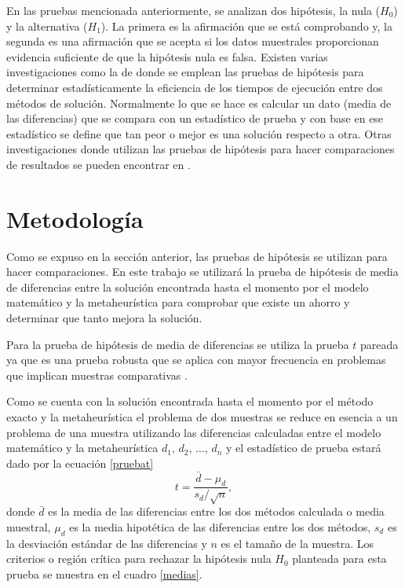 \documentclass[preprint,12pt, pdftex]{elsarticle}
\begin{document}
En las pruebas mencionada anteriormente, se analizan dos hipótesis, la nula ($H_{0}$) y la alternativa ($H_{1}$). La primera es la afirmación que se está comprobando y, la segunda es una afirmación que se acepta si los datos muestrales proporcionan evidencia suficiente de que la hipótesis nula es falsa. Existen varias investigaciones como la de \citet{saucedo2005} donde se emplean las pruebas de hipótesis para determinar estadísticamente la eficiencia de los tiempos de ejecución entre dos métodos de solución. Normalmente lo que se hace es calcular un dato (media de las diferencias) que se compara con un estadístico de prueba y con base en ese estadístico se define que tan peor o mejor es una solución respecto a otra. Otras investigaciones donde utilizan las pruebas de hipótesis para hacer comparaciones de resultados se pueden encontrar en \citet{puentes2016, Gao2016}.

\section{Metodología} \label{metodologia}

Como se expuso en la sección anterior, las pruebas de hipótesis se utilizan para hacer comparaciones. En este trabajo se utilizará la prueba de hipótesis de media de diferencias entre la solución encontrada hasta el momento por el modelo matemático y la metaheurística para comprobar que existe un ahorro y determinar que tanto mejora la solución. 

Para la prueba de hipótesis de media de diferencias se utiliza la prueba $t$ pareada ya que es una prueba robusta que se aplica con mayor frecuencia en problemas que implican muestras comparativas \citet{Adamson2014, Johnston2018}. 

Como se cuenta con la solución encontrada hasta el momento por el método exacto y la metaheurística el problema de dos muestras se reduce en esencia a un problema de una muestra utilizando las diferencias calculadas entre el modelo matemático y la metaheurística $d_{1}$, $d_{2}$, $\dots$, $d_{n}$ y el estadístico de prueba estará dado por la ecuación \ref{pruebat}
\begin{equation} \label{pruebat}
    t = \frac{\bar{d} - \mu_{d}}{s_{d}/\sqrt{n}},
\end{equation}
donde $\bar{d}$ es la media de las diferencias entre los dos métodos calculada o media muestral, $\mu_{d}$ es la media hipotética de las diferencias entre los dos métodos, $s_{d}$ es la desviación estándar de las diferencias y $n$ es el tamaño de la muestra. Los criterios o región crítica para rechazar la hipótesis nula $H_{0}$ planteada para esta prueba se muestra en el cuadro \ref{medias}.
\end{document}
